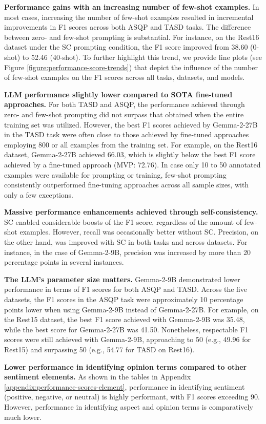 \textbf{Performance gains with an increasing number of few-shot examples.} In most cases, increasing the number of few-shot examples resulted in incremental improvements in F1 scores across both ASQP and TASD tasks. The difference between zero- and few-shot prompting is substantial. For instance, on the Rest16 dataset under the SC prompting condition, the F1 score improved from 38.60 (0-shot) to 52.46 (40-shot). To further highlight this trend, we provide line plots (see Figure \ref{figure:performance-score-trends}) that depict the influence of the number of few-shot examples on the F1 scores across all tasks, datasets, and models.

\textbf{LLM performance slightly lower compared to SOTA fine-tuned approaches.} For both TASD and ASQP, the performance achieved through zero- and few-shot prompting did not surpass that obtained when the entire training set was utilized. However, the best F1 scores achieved by Gemma-2-27B in the TASD task were often close to those achieved by fine-tuned approaches employing 800 or all examples from the training set. For example, on the Rest16 dataset, Gemma-2-27B achieved 66.03, which is slightly below the best F1 score achieved by a fine-tuned approach (MVP: 72.76). In case only 10 to 50 annotated examples were available for prompting or training, few-shot prompting consistently outperformed fine-tuning approaches across all sample sizes, with only a few exceptions.

\textbf{Massive performance enhancements achieved through self-consistency.} SC enabled considerable boosts of the F1 score, regardless of the amount of few-shot examples. However, recall was occasionally better without SC. Precision, on the other hand, was improved with SC in both tasks and across datasets. For instance, in the case of Gemma-2-9B, precision was increased by more than 20 percentage points in several instances.

\textbf{The LLM's parameter size matters.} Gemma-2-9B demonstrated lower performance in terms of F1 scores for both ASQP and TASD. Across the five datasets, the F1 scores in the ASQP task were approximately 10 percentage points lower when using Gemma-2-9B instead of Gemma-2-27B. For example, on the Rest15 dataset, the best F1 score achieved with Gemma-2-9B was 35.48, while the best score for Gemma-2-27B was 41.50. Nonetheless, respectable F1 scores were still achieved with Gemma-2-9B, approaching to 50 (e.g., 49.96 for Rest15) and surpassing 50 (e.g., 54.77 for TASD on Rest16).

\textbf{Lower performance in identifying opinion terms compared to other sentiment elements.} As shown in the tables in Appendix \ref{appendix:performance-scores-element}, performance in identifying sentiment (positive, negative, or neutral) is highly performant, with F1 scores exceeding 90. However, performance in identifying aspect and opinion terms is comparatively much lower. 
